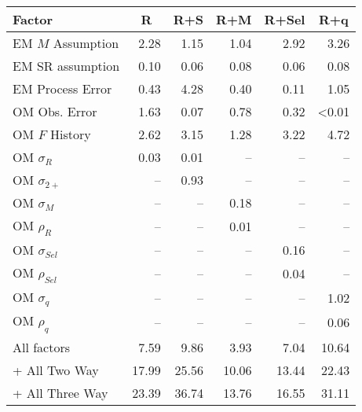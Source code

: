 \begin{center}
\begin{tabular}{lrrrrr}
\hline\hline
\multicolumn{1}{l}{Factor}&\multicolumn{1}{c}{R}&\multicolumn{1}{c}{R+S}&\multicolumn{1}{c}{R+M}&\multicolumn{1}{c}{R+Sel}&\multicolumn{1}{c}{R+q}\tabularnewline
\hline
EM $M$ Assumption& 2.28& 1.15& 1.04& 2.92& 3.26\tabularnewline
EM SR assumption& 0.10& 0.06& 0.08& 0.06& 0.08\tabularnewline
EM Process Error& 0.43& 4.28& 0.40& 0.11& 1.05\tabularnewline
OM Obs. Error& 1.63& 0.07& 0.78& 0.32&\textless  0.01\tabularnewline
OM $F$ History& 2.62& 3.15& 1.28& 3.22& 4.72\tabularnewline
OM $\sigma_R$& 0.03& 0.01&--&--&--\tabularnewline
OM $\sigma_{2+}$ &--& 0.93&--&--&--\tabularnewline
OM $\sigma_M$&--&--& 0.18&--&--\tabularnewline
OM $\rho_R$&--&--& 0.01&--&--\tabularnewline
OM $\sigma_{Sel}$&--&--&--& 0.16&--\tabularnewline
OM $\rho_{Sel}$&--&--&--& 0.04&--\tabularnewline
OM $\sigma_q$&--&--&--&--& 1.02\tabularnewline
OM $\rho_q$&--&--&--&--& 0.06\tabularnewline
All factors& 7.59& 9.86& 3.93& 7.04&10.64\tabularnewline
+ All Two Way&17.99&25.56&10.06&13.44&22.43\tabularnewline
+ All Three Way&23.39&36.74&13.76&16.55&31.11\tabularnewline
\hline
\end{tabular}\end{center}
